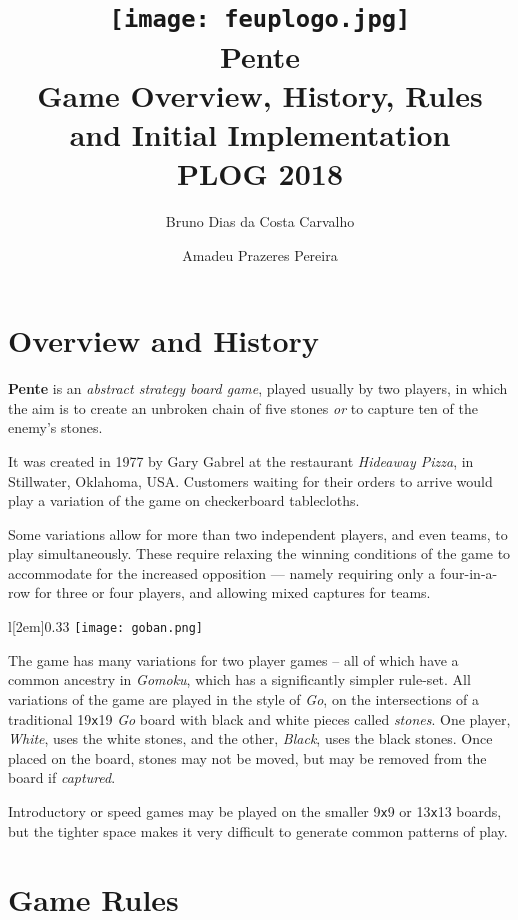 \documentclass[12pt,a4paper,notitlepage]{article}
\title{
	\vspace{-2\baselineskip}
	\texttt{[image: feuplogo.jpg]}\\
	{\Huge Pente}\\
	{\Large Game Overview, History, Rules and Initial Implementation}\\
	{\normalsize PLOG 2018}
}
\author{
	Bruno Dias da Costa Carvalho\hspace*{1.5em}\text{up201606517}
	\and
	Amadeu Prazeres Pereira\hspace*{1.5em}\text{up201605646} 
}
\newcommand*{\boardsize}[1]{#1\texttt{x}#1}
\begin{document}
\maketitle
\thispagestyle{empty}

\section{Overview and History}

\textbf{Pente} is an \textit{abstract strategy board game}, played usually by two players, in which the aim is to create an unbroken chain of five stones \emph{or} to capture ten of the enemy's stones.

It was created in 1977 by Gary Gabrel at the restaurant \textsl{Hideaway Pizza}, in Stillwater, Oklahoma, USA.\supercite{pente-wikipedia}
Customers waiting for their orders to arrive would play a variation of the game on checkerboard tablecloths.\supercite{pente-wikipedia}

Some variations allow for more than two independent players, and even teams, to play simultaneously. These require relaxing the winning conditions of the game to accommodate for the increased opposition --- namely requiring only a four-in-a-row for three or four players, and allowing mixed captures for teams.\supercite{pente-winning-moves}

\begin{wrapfigure}[12]{l}[2em]{0.33\textwidth}
	\vspace*{-1\baselineskip}
	\texttt{[image: goban.png]}
	\caption{\boardsize{19} \textit{Go} board. \label{fig:goban}}
\end{wrapfigure}

The game has many variations for two player games -- all of which have a common ancestry in \textit{Gomoku}, which has a significantly simpler rule-set.
All variations of the game are played in the style of \textit{Go}, on the intersections of a traditional \boardsize{19} \emph{Go} board with black and white pieces called \emph{stones}. One player, \textsl{White}, uses the white stones, and the other, \textsl{Black}, uses the black stones. Once placed on the board, stones may not be moved, but may be removed from the board if \emph{captured}.

Introductory or speed games may be played on the smaller \boardsize{9} or \boardsize{13} boards, but the tighter space makes it very difficult to generate common patterns of play.

\section{Game Rules}
\end{document}
